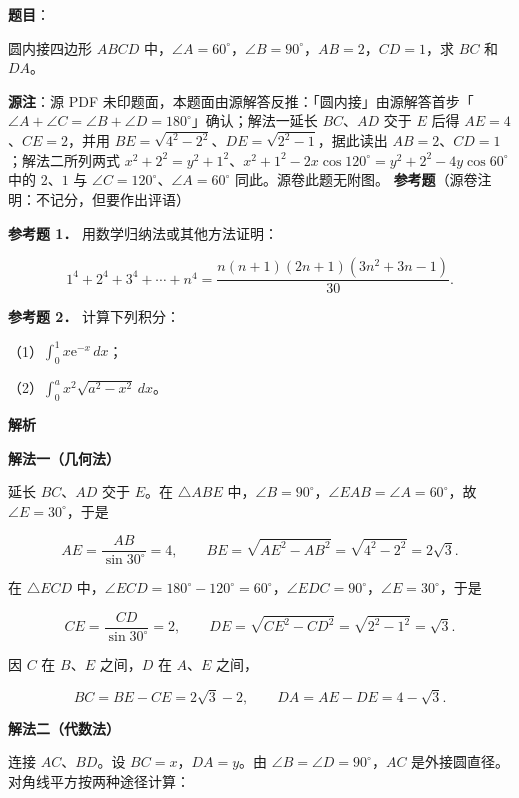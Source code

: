 \begin{answer}

\textbf{题目}：

圆内接四边形 $ABCD$ 中，$\angle A=60^\circ$，$\angle B=90^\circ$，$AB=2$，$CD=1$，求 $BC$ 和 $DA$。

\begin{gktip}
\textbf{源注}：源 PDF 未印题面，本题面由源解答反推：「圆内接」由源解答首步「$\angle A+\angle C=\angle B+\angle D=180^\circ$」确认；解法一延长 $BC$、$AD$ 交于 $E$ 后得 $AE=4$、$CE=2$，并用 $BE=\sqrt{4^2-2^2}$、$DE=\sqrt{2^2-1}$，据此读出 $AB=2$、$CD=1$；解法二所列两式 $x^2+2^2=y^2+1^2$、$x^2+1^2-2x\cos120^\circ=y^2+2^2-4y\cos60^\circ$ 中的 $2$、$1$ 与 $\angle C=120^\circ$、$\angle A=60^\circ$ 同此。源卷此题无附图。
\textbf{参考题}（源卷注明：不记分，但要作出评语）
\end{gktip}

\textbf{参考题 1．} 用数学归纳法或其他方法证明：

\nopagebreak[4]
\[
1^4+2^4+3^4+\cdots+n^4=\frac{n(n+1)(2n+1)(3n^2+3n-1)}{30}.
\]

\textbf{参考题 2．} 计算下列积分：

（1）$\int_0^1 x\mathrm e^{-x}\,dx$；

（2）$\int_0^a x^2\sqrt{a^2-x^2}\,dx$。

\textbf{解析}

\textbf{解法一（几何法）}

延长 $BC$、$AD$ 交于 $E$。在 $\triangle ABE$ 中，$\angle B=90^\circ$，$\angle EAB=\angle A=60^\circ$，故 $\angle E=30^\circ$，于是

\nopagebreak[4]
\[
AE=\frac{AB}{\sin30^\circ}=4,
\qquad
BE=\sqrt{AE^2-AB^2}=\sqrt{4^2-2^2}=2\sqrt3.
\]

在 $\triangle ECD$ 中，$\angle ECD=180^\circ-120^\circ=60^\circ$，$\angle EDC=90^\circ$，$\angle E=30^\circ$，于是

\nopagebreak[4]
\[
CE=\frac{CD}{\sin30^\circ}=2,
\qquad
DE=\sqrt{CE^2-CD^2}=\sqrt{2^2-1^2}=\sqrt3.
\]

因 $C$ 在 $B$、$E$ 之间，$D$ 在 $A$、$E$ 之间，

\nopagebreak[4]
\[
BC=BE-CE=2\sqrt3-2,
\qquad
DA=AE-DE=4-\sqrt3.
\]

\textbf{解法二（代数法）}

连接 $AC$、$BD$。设 $BC=x$，$DA=y$。由 $\angle B=\angle D=90^\circ$，$AC$ 是外接圆直径。对角线平方按两种途径计算：


\end{answer}
